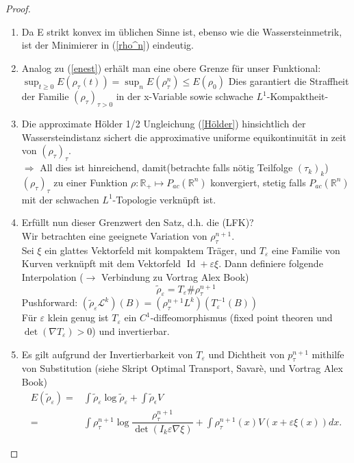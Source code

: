 \documentclass[11pt,a4paper,notitlepage]{scrreprt}
\newcommand{\RR}{\mathbb{R}}
\begin{document}
\begin{proof}
\begin{enumerate}
\item Da E strikt konvex im üblichen Sinne ist, ebenso wie die Wassersteinmetrik, ist der Minimierer in (\ref{rho^n})  eindeutig. 
\item Analog zu (\ref{enest}) erhält man eine obere Grenze für unser Funktional: $\sup_{t\geq 0} E(\rho_\tau(t))=\sup_n E(\rho_\tau^n)\leq E(\rho_0)$
Dies garantiert die Straffheit der Familie $(\rho_\tau)_{\tau >0}$ in der x-Variable sowie schwache $L^1$-Kompaktheit- 
\item Die approximate Hölder 1/2 Ungleichung (\ref{Hölder}) hinsichtlich der Wassersteindistanz sichert die approximative uniforme equikontinuität in zeit von $(\rho_\tau)_\tau$. \\
$\Rightarrow$ All dies ist hinreichend, damit(betrachte falls nötig Teilfolge $(\tau_k)_k$) $(\rho_\tau)_\tau$ zu einer Funktion $\rho: \RR_+ \mapsto P_{ac}(\RR^n)$ konvergiert, stetig falls $P_{ac}(\RR^n)$ mit der schwachen $L^1$-Topologie verknüpft ist. \\
\item Erfüllt nun dieser Grenzwert den Satz, d.h. die (LFK)? \\
Wir betrachten eine geeignete Variation von $\rho_\tau^{n+1}$.\\
Sei $\xi$ ein glattes Vektorfeld mit kompaktem Träger, und $T_\varepsilon$ eine Familie von Kurven verknüpft mit dem Vektorfeld $\operatorname{Id} +\varepsilon\xi$. Dann definiere folgende Interpolation ($\rightarrow$ Verbindung zu Vortrag Alex Book)
\[\tilde{\rho}_\varepsilon=T_\varepsilon \#\rho_\tau^{n+1} \]
Pushforward: $(\tilde{\rho}_\varepsilon \mathcal{L}^k)(B)=(\rho_\tau^{n+1}L^k)(T_\varepsilon^{-1}(B))$\\
Für $\varepsilon$ klein genug ist $T_\varepsilon$ ein $C^1$-diffeomorphismus (fixed point theoren und $\det(\nabla T_\varepsilon)>0$) und invertierbar.\\
\item Es gilt aufgrund der Invertierbarkeit von $T_\varepsilon$ und Dichtheit von $p_\tau^{n+1}$ mithilfe von Substitution (siehe Skript Optimal Transport, Savarè, und Vortrag Alex Book)  
\begin{eqnarray}
E(\tilde{\rho}_\varepsilon)=&\int\tilde{\rho}_\varepsilon\log\tilde{\rho}_\varepsilon+\int\tilde{\rho}_\epsilon V\\
=&\int \rho_\tau^{n+1}\log\dfrac{\rho_\tau^{n+1}}{\det(I_k\varepsilon \nabla \xi)}+\int \rho_\tau^{n+1}(x)V(x+\varepsilon\xi(x))dx.

\end{eqnarray}
\end{enumerate}
\end{proof}
\end{document}
